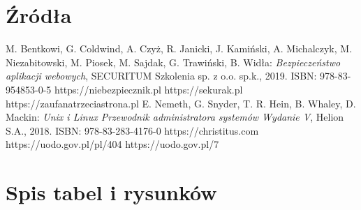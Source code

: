 \documentclass[12pt,a4paper]{article}
\begin{document}
	\section{Źródła}
		\begin{thebibliography}{99}
			 M. Bentkowi, G. Coldwind, A. Czyż, R. Janicki, J. Kamiński, A. Michalczyk, M. Niezabitowski, M. Piosek, M. Sajdak, G. Trawiński, B. Widła:
				\emph{Bezpieczeństwo aplikacji webowych},
				SECURITUM Szkolenia sp. z o.o. sp.k., 2019.
				ISBN: 978-83-954853-0-5
			 https://niebezpiecznik.pl
			 https://sekurak.pl
			 https://zaufanatrzeciastrona.pl
			 E. Nemeth, G. Snyder, T. R. Hein, B. Whaley, D. Mackin:
				\emph{Unix i Linux Przewodnik administratora systemów Wydanie V},
				Helion S.A., 2018.
				ISBN: 978-83-283-4176-0
			 https://christitus.com
			 https://uodo.gov.pl/pl/404
			 https://uodo.gov.pl/7
		\end{thebibliography}
	\newpage
	
	\section{Spis tabel i rysunków}
		\listoffigures
		\listoftables
\end{document}
